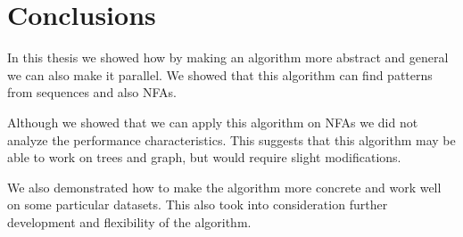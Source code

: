 
\chapter{Conclusions}

In this thesis we showed how by making an algorithm more abstract and
general we can also make it parallel. We showed that this algorithm
can find patterns from sequences and also NFAs.

Although we showed that we can apply this algorithm on NFAs we did
not analyze the performance characteristics. This suggests that 
this algorithm may be able to work on trees and graph, but
would require slight modifications.

We also demonstrated how to make the algorithm more concrete 
and work well on some particular datasets. This also took into 
consideration further development and flexibility of the algorithm.


